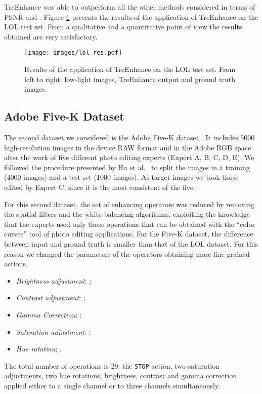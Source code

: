 \documentclass[3p,twocolumn]{elsarticle}
\newcommand{\method}[0]{TreEnhance}
\begin{document}
\method{} was able to outperform all the other methods considered in terms of PSNR and .
Figure \ref{fig:lolresults} presents the results of the application of \method{} on the LOL test set. From a qualitative and a quantitative point of view the results obtained are very satisfactory. 
\begin{figure}[t]
    \centering
        \texttt{[image: images/lol\_res.pdf]}
    \caption{Results of the application of \method{} on the LOL test set. From left to right: low-light images, \method{} output and ground truth images.}
    \label{fig:lolresults}
\end{figure}

\subsection{Adobe Five-K Dataset}
The second dataset we considered is the Adobe Five-K dataset \cite{fivek}. It includes \num{5000} high-resolution images in the device RAW format and in the Adobe RGB space after the work of five different photo editing experts (Expert A, B, C, D, E). We followed the procedure presented by Hu et al.~\cite{hu2018exposure} to split the images in a training (\num{4000} images) and a test set (\num{1000} images).  As target images we took those edited by Expert C, since it is the most consistent of the five.


For this second dataset, the set of enhancing operators  was reduced by removing the spatial filters and the white balancing algorithms, exploiting the knowledge that the experts used only those operations that can be obtained with the ``color curves'' tool of photo editing applications.
For the Five-K dataset, the difference between input and ground truth is smaller than that of the LOL dataset.
For this reason we changed the parameters of the operators obtaining more fine-grained actions.
\begin{itemize}
    \item \emph{Brightness adjustment}: ;
    \item \emph{Contrast adjustment}: ; 
    \item \emph{Gamma Correction}: ; 
    \item \emph{Saturation adjustment}: ; 
    \item \emph{Hue rotation}; .
\end{itemize}
The total number of operations is 29: the \texttt{STOP} action, two saturation adjustments, two hue rotations, brightness, contrast and gamma correction applied either to a single channel or to three channels simultaneously.
\end{document}
